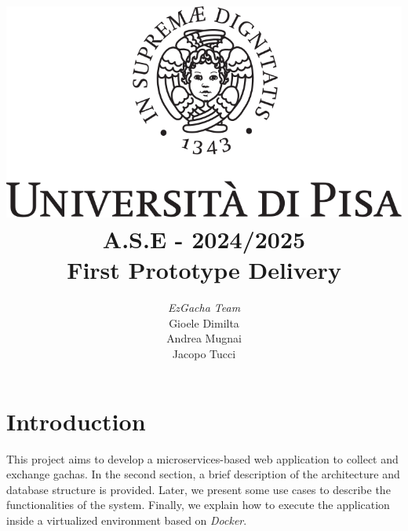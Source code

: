 \documentclass{article}
\begin{document}
\title{\includegraphics[scale=.2]{logo-unipi/logo.png} \\[3ex] A.S.E - 2024/2025 \\ First Prototype Delivery}
\author{{\large \emph{EzGacha Team}} \\[1ex] Gioele Dimilta \\ Andrea Mugnai \\ Jacopo Tucci}
\date{}

\maketitle

\newpage
{}
\tableofcontents

\newpage
\section{Introduction}
This project aims to develop a microservices-based web application to collect and exchange gachas. In the second section, a brief description of the architecture and database structure is provided. Later, we present some use cases to describe the functionalities of the system. Finally, we explain how to execute the application inside a virtualized environment based on \emph{Docker}.
\end{document}
